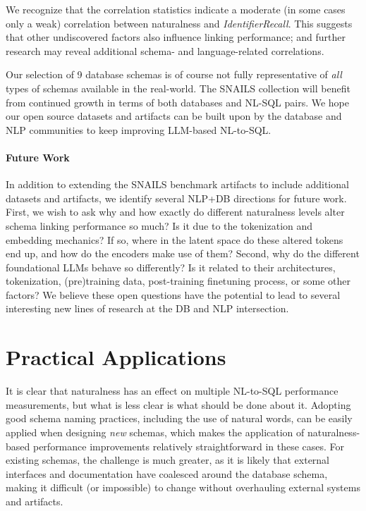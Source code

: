 We recognize that the correlation statistics indicate a moderate (in some cases only a weak) correlation between naturalness and \emph{IdentifierRecall}.
This suggests that other undiscovered factors also influence linking performance; and further research may reveal additional schema- and language-related correlations.

Our selection of 9 database schemas is of course not fully representative of \emph{all} types of schemas available in the real-world.
The SNAILS collection will benefit from continued growth in terms of both databases and NL-SQL pairs.
We hope our open source datasets and artifacts can be built upon by the database and NLP communities to keep improving LLM-based NL-to-SQL.

\paragraph{\textbf{Future Work}}
In addition to extending the SNAILS  benchmark artifacts to include additional datasets and artifacts, we identify several NLP+DB directions for future work.
First, we wish to ask why and how exactly do different naturalness levels alter schema linking performance so much?
Is it due to the tokenization and embedding mechanics?
If so, where in the latent space do these altered tokens end up, and how do the encoders make use of them?
Second, why do the different foundational LLMs behave so differently?
Is it related to their architectures, tokenization, (pre)training data, post-training finetuning process, or some other factors?
We believe these open questions have the potential to lead to several interesting new lines of research at the DB and NLP intersection.


\section{Practical Applications}

It is clear that naturalness has an effect on multiple NL-to-SQL performance measurements, but what is less clear is what should be done about it.
Adopting good schema naming practices, including the use of natural words, can be easily applied when designing \emph{new} schemas, which makes the application of naturalness-based performance improvements relatively straightforward in these cases.
For existing schemas, the challenge is much greater, as it is likely that external interfaces and documentation have coalesced around the database schema, making it difficult (or impossible) to change without overhauling external systems and artifacts.

